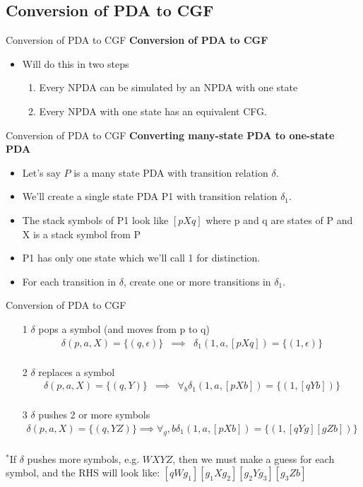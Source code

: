 \documentclass{beamer}
\begin{document}
\subsection{Conversion of PDA to CGF}
\begin{frame}{Conversion of PDA to CGF}
\textbf{Conversion of PDA to CGF}
\begin{itemize}
	\item Will do this in two steps 
	\begin{enumerate}
		\item Every NPDA can be simulated by an NPDA with one state
		\item Every NPDA with one state has an equivalent CFG.
	\end{enumerate}
\end{itemize}
\end{frame}
\begin{frame}{Conversion of PDA to CGF}
	\textbf{Converting many-state PDA to one-state PDA}
	\begin{itemize}
		\item Let’s say $P$ is a many state PDA with transition relation $\delta$.
		\item We’ll create a single	state PDA P1 with transition relation $\delta_1$.
		\item  The stack symbols of P1 look like
		$[pXq]$ where p and q are states of P and X is a stack symbol from P 
		\item P1 has only one state which we’ll call 1 for
		distinction. 
		\item For each transition in $\delta$, create one or more transitions in $\delta_1$.
	\end{itemize}
\end{frame}
\begin{frame}{Conversion of PDA to CGF}
	\begin{itemize}
		\item[1]  $\delta$ pops a symbol (and moves from p to q)
		\begin{eqnarray*}
			\delta(p, a, X) = \{(q,\epsilon)\}
			&\implies&
			\delta_1(1, a, [pXq]) = \{(1,\epsilon)\}
\\
		\end{eqnarray*}
	\item[2] $\delta$ replaces a symbol
\begin{eqnarray*}
	\delta(p, a, X) = \{(q, Y )\}
	&\implies&
	\forall_b \delta_1(1, a, [pXb]) = \{(1, [qY b])\} \\
\end{eqnarray*}
\item[3] $\delta$ pushes 2 or more symbols
\begin{eqnarray*}
	\delta(p, a, X) = \{(q, Y Z)\}
	\implies
	\forall_g, b \delta_1(1, a, [pXb]) = \{(1, [qY g][gZb])\}
\\
\end{eqnarray*}
	\end{itemize}
\small
$^*$If $\delta$ pushes more symbols, e.g. $WXYZ$, then we must make a guess
for each symbol, and the RHS will look like: $[qW g_1][g_1Xg_2][g_2Y g_3][g_3Zb]$
\end{frame}
\end{document}
